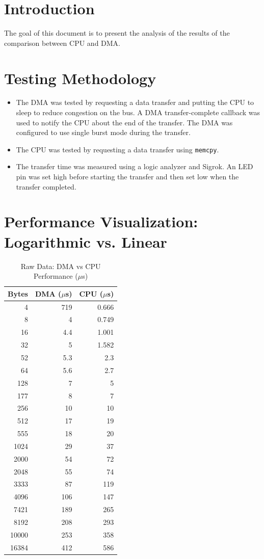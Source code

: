 \documentclass{article}
\begin{document}
\section{Introduction}
The goal of this document is to present the analysis of the results of the comparison between CPU and DMA.
\section{Testing Methodology}
\begin{itemize}
    \item The DMA was tested by requesting a data transfer and putting the CPU to sleep to reduce congestion on the bus. A DMA transfer-complete callback was used to notify the CPU about the end of the transfer. The DMA was configured to use single burst mode during the transfer.
    \item The CPU was tested by requesting a data transfer using \texttt{memcpy}.
    \item The transfer time was measured using a logic analyzer and Sigrok. An LED pin was set high before starting the transfer and then set low when the transfer completed.
\end{itemize}
\section{Performance Visualization: Logarithmic vs. Linear}

\begin{table}[H] %
\centering
\caption{Raw Data: DMA vs CPU Performance ($\mu$s)}
\vspace{0.2cm}
\begin{tabular}{|r|r|r|}
\hline
\textbf{Bytes} & \textbf{DMA ($\mu$s)} & \textbf{CPU ($\mu$s)} \\
\hline
4 & 719 & 0.666 \\
8 & 4 & 0.749 \\
16 & 4.4 & 1.001 \\
32 & 5 & 1.582 \\
52 & 5.3 & 2.3 \\
64 & 5.6 & 2.7 \\
128 & 7 & 5 \\
177 & 8 & 7 \\
256 & 10 & 10 \\
512 & 17 & 19 \\
555 & 18 & 20 \\
1024 & 29 & 37 \\
2000 & 54 & 72 \\
2048 & 55 & 74 \\
3333 & 87 & 119 \\
4096 & 106 & 147 \\
7421 & 189 & 265 \\
8192 & 208 & 293 \\
10000 & 253 & 358 \\
16384 & 412 & 586 \\
\hline
\end{tabular}
\end{table}
\end{document}
